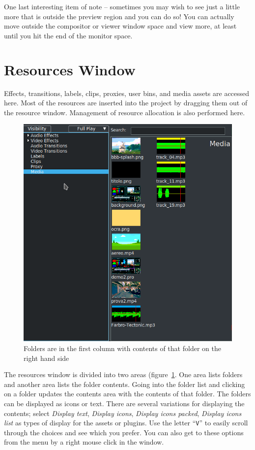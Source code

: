 One last interesting item of note -- sometimes you may wish to see just a little more that is outside the preview region and you can do so!  You can actually move outside the compositor or viewer window space and view more, at least until you hit the end of the monitor space.

\section{Resources Window}%
\label{sec:resources_window}

Effects, transitions, labels, clips, proxies, user bins, and media assets are accessed here. 
Most of the resources are inserted into the project by dragging them out of the resource window. 
Management of resource allocation is also performed here.

\begin{figure}[htpb]
    \centering
    \includegraphics[width=0.7\linewidth]{images/resource_window.png}
    \caption{Folders are in the first column with contents of that folder on the right hand side}
    \label{fig:resource_window}
\end{figure}

The resources window is divided into two areas (figure~\ref{fig:resource_window}. 
One area lists folders and another area lists the folder contents. 
Going into the folder list and clicking on a folder updates the contents area with the contents of that folder. 
The folders can be displayed as icons or text. 
There are several variations for displaying the contents; select \emph{Display text}, \emph{Display icons}, \emph{Display icons packed}, \emph{Display icons list} as types of display for the assets or plugins. 
Use the letter “\texttt{V}” to easily scroll through the choices and see which you prefer.  
You can also get to these options from the menu by a right mouse click in the window.

